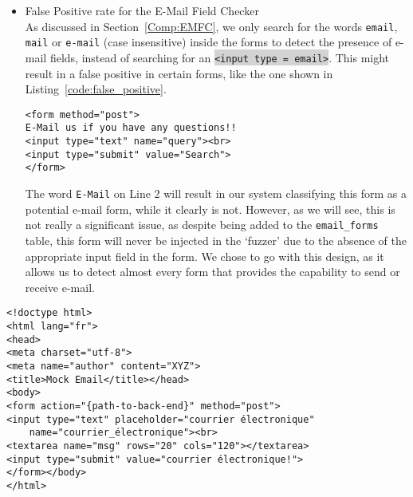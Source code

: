 \begin{itemize}
       	\item \label{issues:fpr}False Positive rate for the E-Mail Field Checker\\
       	As discussed in Section~\ref{Comp:EMFC}, we only search for the words \texttt{email}, \texttt{mail} or \texttt{e-mail} (case insensitive) inside the forms to detect the presence of e-mail fields, instead of searching for an \colorbox{lightgray}{\lstinline{<input type = email>}}. This might result in a false positive in certain forms, like the one shown in Listing~\ref{code:false_positive}.

       	\begin{lstlisting}
<form method="post">
E-Mail us if you have any questions!!
<input type="text" name="query"><br>
<input type="submit" value="Search">
</form>
       	\end{lstlisting}

       	The word \texttt{E-Mail} on Line 2 will result in our system classifying this form as a potential e-mail form, while it clearly is not. However, as we will see, this is not really a significant issue, as despite being added to the \texttt{email\_forms} table, this form will never be injected in the `fuzzer' due to the absence of the appropriate input field in the form. We chose to go with this design, as it allows us to detect almost every form that provides the capability to send or receive e-mail.
	\end{itemize}

\begin{lstlisting}
<!doctype html>
<html lang="fr">
<head>
<meta charset="utf-8">
<meta name="author" content="XYZ">
<title>Mock Email</title></head>
<body>
<form action="{path-to-back-end}" method="post">
<input type="text" placeholder="courrier électronique"
	name="courrier_électronique"><br>
<textarea name="msg" rows="20" cols="120"></textarea>
<input type="submit" value="courrier électronique!">
</form></body>
</html>
\end{lstlisting}